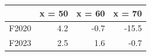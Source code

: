\begin{tabular}{lrrr}
\toprule
 & x = 50 & x = 60 & x = 70 \\
\midrule
F2020 & 4.2 & -0.7 & -15.5 \\
F2023 & 2.5 & 1.6 & -0.7 \\
\bottomrule
\end{tabular}
